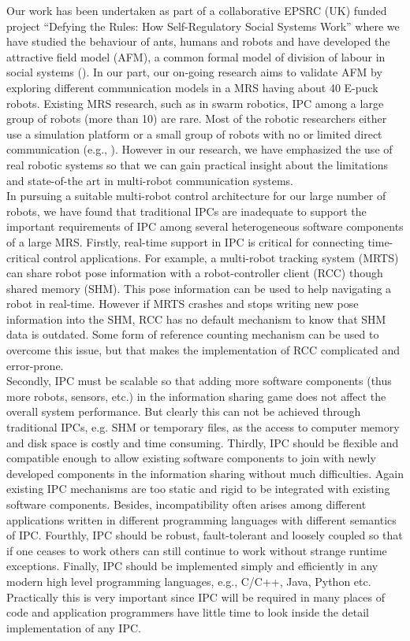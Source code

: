 \documentclass{ifacconf}
\begin{document}
Our work has been undertaken as part of a collaborative EPSRC (UK) funded project ``Defying the Rules: How Self-Regulatory Social Systems Work” where we have studied the behaviour of ants, humans and robots and have developed the attractive field model (AFM), a common formal model of division of labour in social systems (\cite{Arcaute+2008}). In our part, our on-going research aims to validate AFM by exploring different communication models in a MRS having about 40 E-puck robots.  Existing MRS research, such as in swarm robotics, IPC among a large group of robots (more than 10) are rare. Most of the robotic researchers either use a simulation platform or a small group of robots with no or limited direct communication (e.g., \cite{Labella2007}).   However in our research, we have emphasized the use of real robotic systems so that we can gain practical insight about the limitations and state-of-the art in multi-robot communication systems.\\
In pursuing a suitable multi-robot control architecture for our large number of robots, we have found that traditional IPCs are inadequate to support the important requirements of IPC among several heterogeneous software components of a large MRS. Firstly, real-time support in IPC is critical for connecting time-critical control applications. For example, a multi-robot tracking system (MRTS) can share robot pose information with a robot-controller client (RCC) though shared memory (SHM). This pose information can be used to help navigating a robot in real-time. However if MRTS crashes and stops writing new pose information into the SHM, RCC has no default mechanism to know that SHM data is outdated. Some form of reference counting mechanism can be used to overcome this issue, but that makes the implementation of RCC complicated and error-prone.\\
Secondly, IPC must be scalable so that adding more software components (thus more robots, sensors, etc.) in the information sharing game does not affect the overall system performance. But clearly this can not be achieved through traditional IPCs, e.g. SHM or temporary files,  as the access to computer memory and disk space is costly and time consuming. Thirdly, IPC should be flexible and compatible enough to allow existing software components to join with newly developed components in the information sharing without much difficulties. Again existing IPC mechanisms are too static and rigid to be integrated with existing software components. Besides, incompatibility often arises among different applications written in different programming languages with different semantics of IPC. Fourthly, IPC should be robust, fault-tolerant and loosely coupled so that if one ceases to work others can still continue to work without strange runtime exceptions. Finally, IPC should be implemented simply and efficiently in any modern high level programming languages, e.g., C/C++, Java, Python etc. Practically this is very important since IPC will be required in many places of code and application programmers have little time to look inside the detail implementation of any IPC.\\
\end{document}
